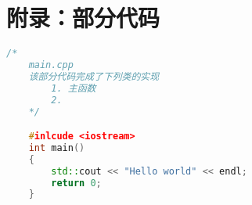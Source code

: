 
\section{附录：部分代码}

\begin{lstlisting}[language=c++]
    /*
    main.cpp
    该部分代码完成了下列类的实现
        1. 主函数
        2. 
    */

    #inlcude <iostream>
    int main()
    {
        std::cout << "Hello world" << endl;
        return 0;
    }

\end{lstlisting}
